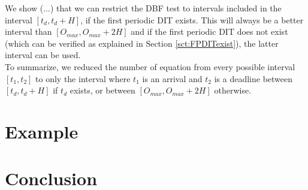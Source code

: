 \documentclass[times, 10pt,twocolumn, a4paper]{article}
\begin{document}
We show (...) that we can restrict the DBF test to intervals included in the interval $[t_d, t_d + H]$, if the first periodic DIT exists. This will always be a better interval than $[O_{max}, O_{max} + 2H]$ and if the first periodic DIT does not exist (which can be verified as explained in Section \ref{sct:FPDITexist}), the latter interval can be used.\\

To summarize, we reduced the number of equation from every possible interval $[t_1, t_2]$ to only the interval where $t_1$ is an arrival and $t_2$ is a deadline between $[t_d, t_d + H]$ if $t_d$ exists, or between $[O_{max}, O_{max} + 2H]$ otherwise.

\section{Example}

\section{Conclusion}



\end{document}
